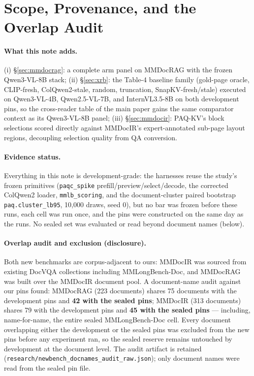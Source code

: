 \documentclass[letterpaper]{article} %
\newcommand{\paqc}{\textsc{PAQ-KV}}
\begin{document}
\section{Scope, Provenance, and the Overlap Audit}\label{sec:scope}

\paragraph{What this note adds.} (i) \S\ref{sec:mmdocrag}: a complete arm panel on MMDocRAG \citep{dong2025mmdocrag} with the frozen Qwen3-VL-8B stack; (ii) \S\ref{sec:xrb}: the Table-4 baseline family (gold-page oracle, CLIP-fresh, ColQwen2-stale, random, truncation, SnapKV-fresh/stale) executed on Qwen3-VL-4B, Qwen2.5-VL-7B, and InternVL3.5-8B on both development pins, so the cross-reader table of the main paper gains the same comparator context as its Qwen3-VL-8B panel; (iii) \S\ref{sec:mmdocir}: \paqc{}'s block selections scored directly against MMDocIR's \citep{dong2025mmdocir} expert-annotated sub-page layout regions, decoupling selection quality from QA conversion.

\paragraph{Evidence status.} Everything in this note is development-grade: the harnesses reuse the study's frozen primitives (\texttt{paqc\_spike} prefill/preview/select/decode, the corrected ColQwen2 loader, \texttt{mmlb\_scoring}, and the document-cluster paired bootstrap \texttt{paq.cluster\_lb95}, 10{,}000 draws, seed 0), but no bar was frozen before these runs, each cell was run once, and the pins were constructed on the same day as the runs. No sealed set was evaluated or read beyond document names (below).

\paragraph{Overlap audit and exclusion (disclosure).} Both new benchmarks are corpus-adjacent to ours: MMDocIR was sourced from existing DocVQA collections including MMLongBench-Doc, and MMDocRAG was built over the MMDocIR document pool. A document-name audit against our pins found: MMDocRAG (223 documents) shares 75 documents with the development pins and \textbf{42 with the sealed pins}; MMDocIR (313 documents) shares 79 with the development pins and \textbf{45 with the sealed pins} --- including, name-for-name, the entire sealed MMLongBench-Doc cell. Every document overlapping either the development or the sealed pins was excluded from the new pins before any experiment ran, so the sealed reserve remains untouched by development at the document level. The audit artifact is retained (\texttt{research/newbench\_docnames\_audit\_raw.json}); only document names were read from the sealed pin file.
\end{document}

